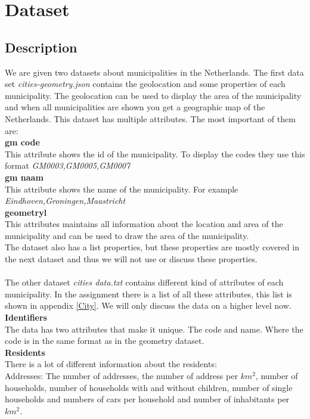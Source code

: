 \section{Dataset}\label{sec:dat}
\subsection{Description}
We are given two datasets about municipalities in the Netherlands. The first data set \emph{cities-geometry.json} contains the geolocation and some properties of each municipality. The geolocation can be used to display the area of the municipality and when all municipalities are shown you get a geographic map of the Netherlands. This dataset has multiple attributes. The most important of them are:\\
\textbf{gm code} \\
This attribute shows the id of the municipality. To display the codes they use this format \emph{GM0003,GM0005,GM0007}\\
\textbf{gm naam} \\
This attribute shows the name of the municipality. For example \emph{Eindhoven,Groningen,Maastricht} \\
\textbf{geometryl} \\
This attributes maintains all information about the location and area of the municipality and can be used to draw the area of the municipality. \\
The dataset also has a list properties, but these properties are mostly covered in the next dataset and thus we will not use or discuss these properties. \\ \\
 The other dataset \emph{ cities data.txt}  contains different kind of attributes of each municipality. In the assignment there is a list of all these attributes, this list is shown in appendix \ref{City}. We will only discuss the data on a higher level now. \\
 \textbf{Identifiers} \\
 The data has two attributes that make it unique. The code and name. Where the code  is in the same format as in the geometry dataset. \\
  \textbf{Residents} \\
There is a lot of different information about the residents:\\
Addresses: The number of addresses, the number of address per $km^{2}$, number of households, number of households with and without children, number of single households and numbers of cars per household and number of inhabitants per $km^{2}$. \\
